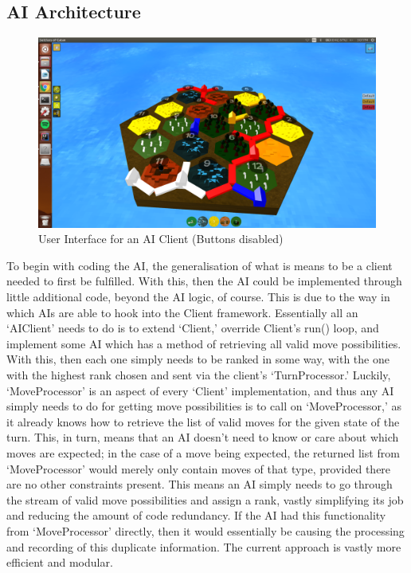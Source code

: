 \documentclass[a4paper,doc,draftfirst]{apa6}
\begin{document}
\subsection{AI Architecture}
\begin{figure}[hbtp]
      \includegraphics[width=\textwidth]{userInterfaceAI}
      \caption{User Interface for an AI Client (Buttons disabled)}
\end{figure}
To begin with coding the AI, the generalisation of what is means to be a client needed to first be fulfilled. With this, then the AI could be implemented through little additional code, beyond the AI logic, of course. This is due to the way in which AIs are able to hook into the Client framework. Essentially all an ‘AIClient’ needs to do is to extend ‘Client,’ override Client’s run() loop, and implement some AI which has a method of retrieving all valid move possibilities.  With this, then each one simply needs to be ranked in some way, with the one with the highest rank chosen and sent via the client’s ‘TurnProcessor.’ Luckily, ‘MoveProcessor’ is an aspect of every ‘Client’ implementation, and thus any AI simply needs to do for getting move possibilities is to call on ‘MoveProcessor,’ as it already knows how to retrieve the list of valid moves for the given state of the turn. This, in turn, means that an AI doesn’t need to know or care about which moves are expected; in the case of a move being expected, the returned list from ‘MoveProcessor’ would merely only contain moves of that type, provided there are no other constraints present. This means an AI simply needs to go through the stream of valid move possibilities and assign a rank, vastly simplifying its job and reducing the amount of code redundancy. If the AI had this functionality from ‘MoveProcessor’ directly, then it would essentially be causing the processing and recording of this duplicate information. The current approach is vastly more efficient and modular.
\end{document}
